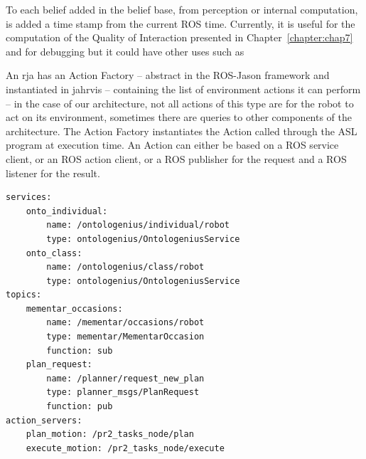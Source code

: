 \documentclass[a4paper,11pt,twoside]{StyleThese}
\begin{document}
To each belief added in the belief base, from perception or internal computation, is added a time stamp from the current ROS time. Currently, it is useful for the computation of the Quality of Interaction presented in Chapter~\ref{chapter:chap7} and for debugging but it could have other uses such as 

An \acrshort{rja} has an Action Factory -- abstract in the ROS-Jason framework and instantiated in \acrshort{jahrvis} -- containing the list of environment actions it can perform -- in the case of our architecture, not all actions of this type are for the robot to act on its environment, sometimes there are queries to other components of the architecture. The Action Factory instantiates the Action called through the ASL program at execution time. An Action can either be based on a ROS service client, or an ROS action client, or a ROS publisher for the request and a ROS listener for the result. 

\begin{lstlisting}[caption={Example of service, topic and action server definitions in a YAML file.}, label={chap4:lst:ros-jason}]
services:
	onto_individual: 
		name: /ontologenius/individual/robot
		type: ontologenius/OntologeniusService
	onto_class: 
		name: /ontologenius/class/robot
		type: ontologenius/OntologeniusService
topics:
	mementar_occasions: 
		name: /mementar/occasions/robot
		type: mementar/MementarOccasion
		function: sub
	plan_request:
		name: /planner/request_new_plan
		type: planner_msgs/PlanRequest
		function: pub
action_servers:
	plan_motion: /pr2_tasks_node/plan
	execute_motion: /pr2_tasks_node/execute
\end{lstlisting}

\ifdefined{}
\else


\end{document}
